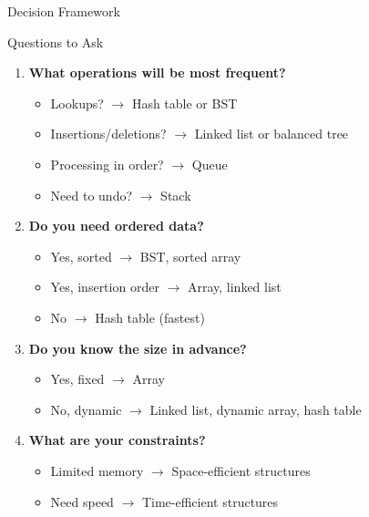 \documentclass[aspectratio=169,xcolor=dvipsnames]{beamer}
\begin{document}
\begin{frame}{Decision Framework}
  \begin{block}{Questions to Ask}
    \begin{enumerate}
      \item \textbf{What operations will be most frequent?}
        \begin{itemize}
          \item Lookups? $\rightarrow$ Hash table or BST
          \item Insertions/deletions? $\rightarrow$ Linked list or balanced tree
          \item Processing in order? $\rightarrow$ Queue
          \item Need to undo? $\rightarrow$ Stack
        \end{itemize}

      \item \textbf{Do you need ordered data?}
        \begin{itemize}
          \item Yes, sorted $\rightarrow$ BST, sorted array
          \item Yes, insertion order $\rightarrow$ Array, linked list
          \item No $\rightarrow$ Hash table (fastest)
        \end{itemize}

      \item \textbf{Do you know the size in advance?}
        \begin{itemize}
          \item Yes, fixed $\rightarrow$ Array
          \item No, dynamic $\rightarrow$ Linked list, dynamic array, hash table
        \end{itemize}

      \item \textbf{What are your constraints?}
        \begin{itemize}
          \item Limited memory $\rightarrow$ Space-efficient structures
          \item Need speed $\rightarrow$ Time-efficient structures
        \end{itemize}
    \end{enumerate}
  \end{block}
\end{frame}
\end{document}

